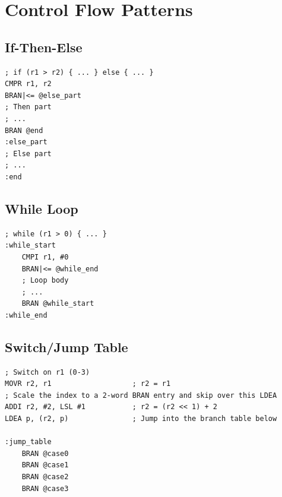 \section{Control Flow Patterns}

\subsection{If-Then-Else}
\begin{lstlisting}
; if (r1 > r2) { ... } else { ... }
CMPR r1, r2
BRAN|<= @else_part
; Then part
; ...
BRAN @end
:else_part
; Else part
; ...
:end
\end{lstlisting}

\subsection{While Loop}
\begin{lstlisting}
; while (r1 > 0) { ... }
:while_start
    CMPI r1, #0
    BRAN|<= @while_end
    ; Loop body
    ; ...
    BRAN @while_start
:while_end
\end{lstlisting}

\subsection{Switch/Jump Table}
\begin{lstlisting}
; Switch on r1 (0-3)
MOVR r2, r1                   ; r2 = r1
; Scale the index to a 2-word BRAN entry and skip over this LDEA
ADDI r2, #2, LSL #1           ; r2 = (r2 << 1) + 2
LDEA p, (r2, p)               ; Jump into the branch table below

:jump_table
    BRAN @case0
    BRAN @case1
    BRAN @case2
    BRAN @case3
\end{lstlisting}
